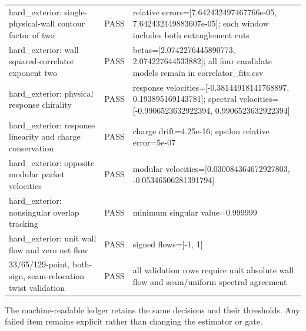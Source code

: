 \documentclass[aps,prb,onecolumn,nofootinbib,superscriptaddress]{revtex4-2}
\begin{document}
\begin{longtable}{p{}p{}p{}}
hard\_exterior: single-physical-wall contour factor of two & PASS & relative errors=[7.642432497467766e-05, 7.642432449883607e-05]; each window includes both entanglement cuts \\
hard\_exterior: wall squared-correlator exponent two & PASS & betas=[2.0742276445890773, 2.074227644533882]; all four candidate models remain in correlator\_fits.csv \\
hard\_exterior: physical response chirality & PASS & response velocities=[-0.38144918141768897, 0.193895169143781]; spectral velocities=[-0.9906523632922394, 0.9906523632922394] \\
hard\_exterior: response linearity and charge conservation & PASS & charge drift=4.25e-16; epsilon relative error=5e-07 \\
hard\_exterior: opposite modular packet velocities & PASS & modular velocities=[0.030084364672927803, -0.05346506281391794] \\
hard\_exterior: nonsingular overlap tracking & PASS & minimum singular value=0.999999 \\
hard\_exterior: unit wall flow and zero net flow & PASS & signed flows=[-1, 1] \\
33/65/129-point, both-sign, seam-relocation twist validation & PASS & all validation rows require unit absolute wall flow and seam/uniform spectral agreement \\
\bottomrule
\end{longtable}
The machine-readable ledger retains the same decisions and their thresholds.  Any failed
item remains explicit rather than changing the estimator or gate.
\end{document}
